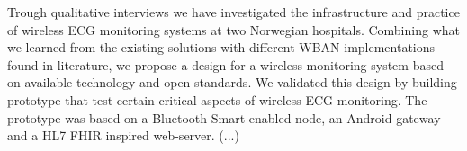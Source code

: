 \begin{0_abstract}

\noindent
Trough qualitative interviews we have investigated the infrastructure and practice of wireless ECG monitoring systems at two Norwegian hospitals. Combining what we learned from the existing solutions with different WBAN implementations found in literature, we propose a design for a wireless monitoring system based on available technology and open standards. We validated this design by building prototype that test certain critical aspects of wireless ECG monitoring. The prototype was based on a Bluetooth Smart enabled node, an Android gateway and a HL7 FHIR inspired web-server.
(...)

\end{0_abstract}